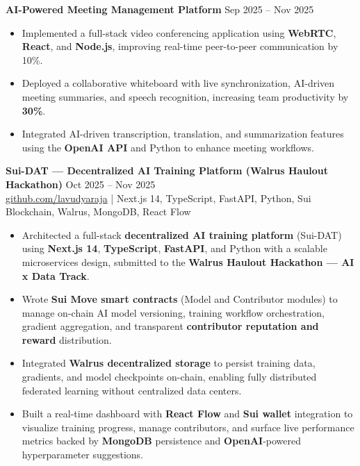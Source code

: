 \documentclass[11pt,letterpaper]{article}
\begin{document}
\vspace{4pt}
\textbf{AI-Powered Meeting Management Platform} \hfill Sep 2025 -- Nov 2025
\begin{itemize}
  \item Implemented a full-stack video conferencing application using \textbf{WebRTC}, \textbf{React}, and \textbf{Node.js}, improving real-time peer-to-peer communication by 10\%.
  \item Deployed a collaborative whiteboard with live synchronization, AI-driven meeting summaries, and speech recognition, increasing team productivity by \textbf{30\%}.
  \item Integrated AI-driven transcription, translation, and summarization features using the \textbf{OpenAI API} and Python to enhance meeting workflows.
\end{itemize}

\vspace{4pt}
\textbf{Sui-DAT --- Decentralized AI Training Platform (Walrus Haulout Hackathon)} \hfill Oct 2025 -- Nov 2025 \\
\href{https://github.com/lavudyaraja}{github.com/lavudyaraja} \;|\; Next.js 14, TypeScript, FastAPI, Python, Sui Blockchain, Walrus, MongoDB, React Flow
\begin{itemize}
  \item Architected a full-stack \textbf{decentralized AI training platform} (Sui-DAT) using \textbf{Next.js 14}, \textbf{TypeScript}, \textbf{FastAPI}, and Python with a scalable microservices design, submitted to the \textbf{Walrus Haulout Hackathon --- AI x Data Track}.
  \item Wrote \textbf{Sui Move smart contracts} (Model and Contributor modules) to manage on-chain AI model versioning, training workflow orchestration, gradient aggregation, and transparent \textbf{contributor reputation and reward} distribution.
  \item Integrated \textbf{Walrus decentralized storage} to persist training data, gradients, and model checkpoints on-chain, enabling fully distributed federated learning without centralized data centers.
  \item Built a real-time dashboard with \textbf{React Flow} and \textbf{Sui wallet} integration to visualize training progress, manage contributors, and surface live performance metrics backed by \textbf{MongoDB} persistence and \textbf{OpenAI}-powered hyperparameter suggestions.
\end{itemize}
\end{document}
